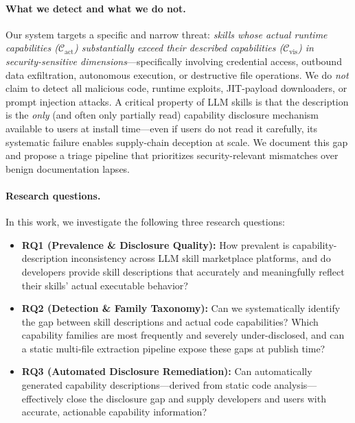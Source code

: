 \paragraph{What we detect and what we do not.}
Our system targets a specific and narrow threat:
\emph{skills whose actual runtime capabilities ($\mathcal{C}_{\text{act}}$) substantially
exceed their described capabilities ($\mathcal{C}_{\text{vis}}$) in security-sensitive
dimensions}---specifically involving credential access, outbound
data exfiltration, autonomous execution, or destructive file operations.
We do \emph{not} claim to detect all malicious code, runtime exploits,
JIT-payload downloaders, or prompt injection attacks.
A critical property of LLM skills is that the description is the \emph{only}
(and often only partially read) capability disclosure mechanism available
to users at install time---even if users do not read it carefully,
its systematic failure enables supply-chain deception at scale.
We document this gap and propose a triage pipeline that prioritizes
security-relevant mismatches over benign documentation lapses.

\paragraph{Research questions.}
In this work, we investigate the following three research questions:

\begin{itemize}[leftmargin=*,topsep=2pt,itemsep=1pt]

\item \textbf{RQ1 (Prevalence \& Disclosure Quality):}
  How prevalent is capability-description inconsistency across LLM skill
  marketplace platforms, and do developers provide skill descriptions that
  accurately and meaningfully reflect their skills' actual executable behavior?

\item \textbf{RQ2 (Detection \& Family Taxonomy):}
  Can we systematically identify the gap between skill descriptions and
  actual code capabilities?
  Which capability families are most frequently and severely under-disclosed,
  and can a static multi-file extraction pipeline expose these gaps at
  publish time?

\item \textbf{RQ3 (Automated Disclosure Remediation):}
  Can automatically generated capability descriptions---derived from static
  code analysis---effectively close the disclosure gap and supply developers
  and users with accurate, actionable capability information?

\end{itemize}

